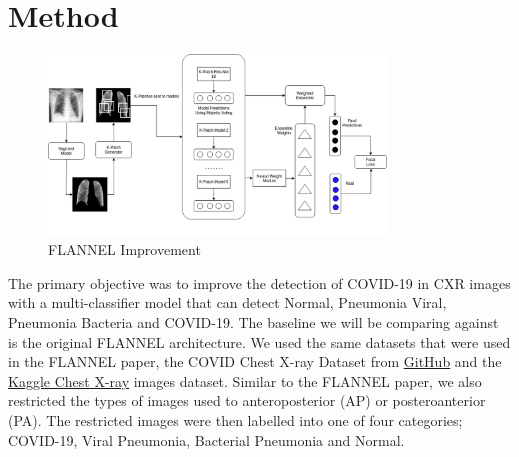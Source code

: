 \documentclass{sigkddExp}
\begin{document}
\section{Method}

\begin{figure}[h]
    \includegraphics[width=0.8\textwidth]{../doc/images/FLANNEL-IMPROVED.png}
    \caption{FLANNEL Improvement}
    \label{fig:improve}
\end{figure}

The primary objective was to improve the detection of COVID-19 in CXR images
with a multi-classifier model that can detect Normal, Pneumonia Viral, Pneumonia
Bacteria and COVID-19. The baseline we will be comparing against is the original
FLANNEL architecture. We used the same datasets that were used in the FLANNEL
paper, the COVID Chest X-ray Dataset \cite{cohen2020covidProspective} from
\href{https://github.com/ieee8023/covid-chestxray-dataset}{GitHub} and the
\href{https://www.kaggle.com/paultimothymooney/chest-xray-pneumonia}{Kaggle
    Chest X-ray} images dataset. Similar to the FLANNEL paper, we also restricted
the types of images used to anteroposterior (AP) or posteroanterior (PA). The
restricted images were then labelled into one of four categories; COVID-19,
Viral Pneumonia, Bacterial Pneumonia and Normal.
\end{document}
